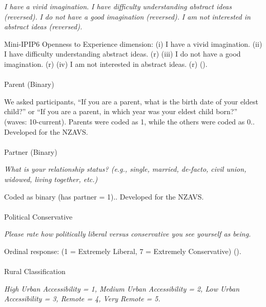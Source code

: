 \documentclass[
  single column]{article}
\makeatletter
\let\oldparagraph\paragraph
\renewcommand{\paragraph}{
    \@ifstar
      \xxxParagraphStar
      \xxxParagraphNoStar
  }
\newcommand{\xxxParagraphStar}[1]{\oldparagraph*{#1}\mbox{}}
\newcommand{\xxxParagraphNoStar}[1]{\oldparagraph{#1}\mbox{}}
\makeatother
\begin{document}
\emph{I have a vivid imagination.} \emph{I have difficulty understanding
abstract ideas (reversed).} \emph{I do not have a good imagination
(reversed).} \emph{I am not interested in abstract ideas (reversed).}

Mini-IPIP6 Openness to Experience dimension: (i) I have a vivid
imagination. (ii) I have difficulty understanding abstract ideas. (r)
(iii) I do not have a good imagination. (r) (iv) I am not interested in
abstract ideas. (r) ().

\paragraph{Parent (Binary)}\label{parent-binary}

We asked participants, ``If you are a parent, what is the birth date of
your eldest child?'' or ``If you are a parent, in which year was your
eldest child born?'' (waves: 10-current). Parents were coded as 1, while
the others were coded as 0.. Developed for the NZAVS.

\paragraph{Partner (Binary)}\label{partner-binary}

\emph{What is your relationship status? (e.g., single, married,
de-facto, civil union, widowed, living together, etc.)}

Coded as binary (has partner = 1).. Developed for the NZAVS.

\paragraph{Political Conservative}\label{political-conservative}

\emph{Please rate how politically liberal versus conservative you see
yourself as being.}

Ordinal response: (1 = Extremely Liberal, 7 = Extremely Conservative)
().

\paragraph{Rural Classification}\label{rural-classification}

\emph{High Urban Accessibility = 1, Medium Urban Accessibility = 2, Low
Urban Accessibility = 3, Remote = 4, Very Remote = 5.}
\end{document}
